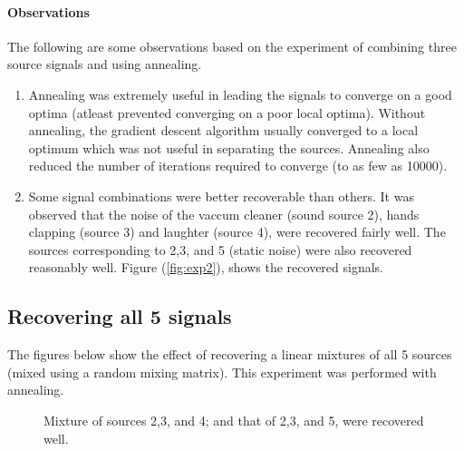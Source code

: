 \documentclass[11pt]{article}
\begin{document}
\paragraph{Observations}
The following are some observations based on the experiment of combining three source signals and using annealing.
\begin{enumerate}
\item Annealing was extremely useful in leading the signals to converge on a good optima (atleast prevented converging on a poor local optima). Without annealing, the gradient descent algorithm usually converged to a local optimum which was not useful in separating the sources. Annealing also reduced the number of iterations required to converge (to as few as 10000).
\item Some signal combinations were better recoverable than others. It was observed that the noise of the vaccum cleaner (sound source 2), hands clapping (source 3) and laughter (source 4), were recovered fairly well. The sources corresponding to 2,3, and 5 (static noise) were also recovered reasonably well. Figure (\ref{fig:exp2}), shows the recovered signals.
\end{enumerate}

\subsection{Recovering all 5 signals}
The figures below show the effect of recovering a linear mixtures of all 5 sources (mixed using a random mixing matrix). This experiment was performed with annealing.
\begin{figure}[hbt]
\begin{center}
\end{center}
\caption{Mixture of sources 2,3, and 4; and that of 2,3, and 5, were recovered well.}\label{fig:exp3}
\end{figure}
\end{document}
